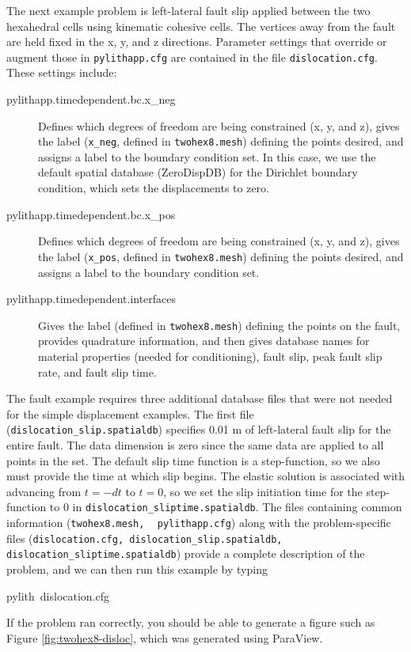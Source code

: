 The next example problem is left-lateral fault slip applied between
the two hexahedral cells using kinematic cohesive cells. The vertices
away from the fault are held fixed in the x, y, and z directions.
Parameter settings that override or augment those in \texttt{pylithapp.cfg}
are contained in the file \texttt{dislocation.cfg}. These settings
include:
\begin{description}
\item [{pylithapp.timedependent.bc.x\_neg}] Defines which degrees of freedom
are being constrained (x, y, and z), gives the label (\texttt{x\_neg},
defined in \texttt{twohex8.mesh}) defining the points desired, and
assigns a label to the boundary condition set. In this case, we use
the default spatial database (ZeroDispDB) for the Dirichlet boundary
condition, which sets the displacements to zero.
\item [{pylithapp.timedependent.bc.x\_pos}] Defines which degrees of freedom
are being constrained (x, y, and z), gives the label (\texttt{x\_pos},
defined in \texttt{twohex8.mesh}) defining the points desired, and
assigns a label to the boundary condition set.
\item [{pylithapp.timedependent.interfaces}] Gives the label (defined in
\texttt{twohex8.mesh}) defining the points on the fault, provides
quadrature information, and then gives database names for material
properties (needed for conditioning), fault slip, peak fault slip
rate, and fault slip time.
\end{description}
The fault example requires three additional database files that were
not needed for the simple displacement examples. The first file (\texttt{dislocation\_slip.spatialdb})
specifies 0.01 m of left-lateral fault slip for the entire fault.
The data dimension is zero since the same data are applied to all
points in the set. The default slip time function is a step-function,
so we also must provide the time at which slip begins. The elastic
solution is associated with advancing from $t=-dt$ to $t=0$, so
we set the slip initiation time for the step-function to 0 in \texttt{dislocation\_sliptime.spatialdb}.
The files containing common information (\texttt{twohex8.mesh,}{\small{}
}\texttt{\small{}}~\linebreak{}
\texttt{pylithapp.cfg}) along with the problem-specific files (\texttt{dislocation.cfg,
dislocation\_slip.spatialdb, dislocation\_sliptime.spatialdb}) provide
a complete description of the problem, and we can then run this example
by typing
\begin{lyxcode}
pylith~dislocation.cfg
\end{lyxcode}
If the problem ran correctly, you should be able to generate a figure
such as Figure \ref{fig:twohex8-disloc}, which was generated using
ParaView.

